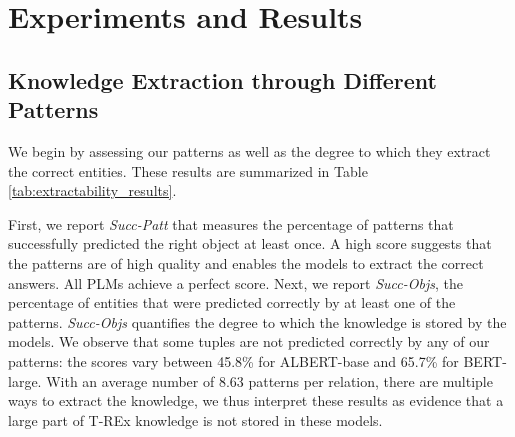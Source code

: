 \section{Experiments and Results}
\label{sec:experiments}


% 



\subsection{Knowledge Extraction through Different Patterns}




We begin by assessing our patterns as
well as the degree to which they extract the correct
entities. These results are summarized in Table
\ref{tab:extractability_results}.

First, we report \emph{Succ-Patt} that measures the percentage of
patterns that successfully predicted the right object at
least once. A high score suggests that the patterns are of high quality and enables the models to extract the correct answers. All PLMs achieve a perfect score.
Next, we report
\emph{Succ-Objs},
the percentage of entities that were predicted correctly by at least one of the patterns.
\textit{Succ-Objs} quantifies the degree to which the knowledge is stored by the models.
We observe that some tuples are not predicted correctly by any of our patterns: the scores vary between 45.8\% for ALBERT-base and 65.7\% for BERT-large. %
With an average number of 8.63 patterns per relation, there are multiple ways to extract the knowledge, we thus interpret these results as evidence that a large part of T-REx knowledge is not stored in these models.


